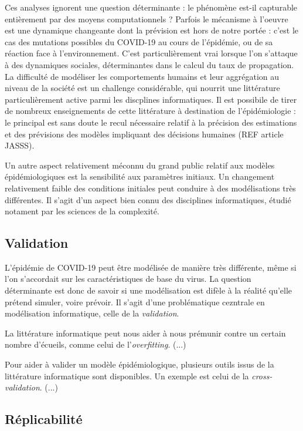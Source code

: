 \documentclass[review]{elsarticle}
\begin{document}
Ces analyses ignorent une question déterminante : le phénomène est-il capturable entièrement par des moyens computationnels ? Parfois le mécanisme à l'oeuvre est une dynamique changeante dont la prévision est hors de notre portée : c'est le cas des mutations possibles du COVID-19 au cours de l'épidémie, ou de sa réaction face à l'environnement. C'est particulièrement vrai lorsque l'on s'attaque à des dynamiques sociales, déterminantes dans le calcul du taux de propagation. La difficulté de modéliser les comportements humains et leur aggrégation au niveau de la société est un challenge considérable, qui nourrit une littérature particulièrement active parmi les discplines informatiques. Il est possibile de tirer de nombreux enseignements de cette littérature à destination de l'épidémiologie : le principal est sans doute le recul nécessaire relatif à la précision des estimations et des prévisions des modèles impliquant des décisions humaines (REF article JASSS).

Un autre aspect relativement méconnu du grand public relatif aux modèles épidémiologiques est la sensibilité aux paramètres initiaux. Un changement relativement faible des conditions initiales peut conduire à des modélisations très différentes. Il s'agit d'un aspect bien connu des disciplines informatiques, étudié notament par les sciences de la complexité. 

\subsection{Validation}

L'épidémie de COVID-19 peut être modélisée de manière très différente, même si l'on s'accordait sur les caractéristiques de base du virus. La question déterminante est donc de savoir si une modélisation est difèle à la réalité qu'elle prétend simuler, voire prévoir. Il s'agit d'une problématique cezntrale en modélisation informatique, celle de la \textit{validation}.

La littérature informatique peut nous aider à nous prémunir contre un certain nombre d'écueils, comme celui de l'\textit{overfitting}. (...)

Pour aider à valider un modèle épidémiologique, plusieurs outils issus de la littérature informatique sont disponibles. Un exemple est celui de la \textit{cross-validation}. (...)


\subsection{Réplicabilité}
\end{document}
